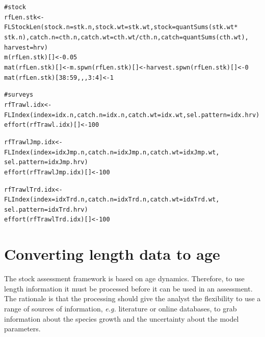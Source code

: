 \documentclass[a4paper,english,10pt]{article}\usepackage[]{graphicx}\usepackage[]{color}
\makeatletter
\newcommand{\hlnum}[1]{\textcolor[rgb]{0.2,0.2,0.2}{#1}}%
\newcommand{\hlcom}[1]{\textcolor[rgb]{0.2,0.267,0.4}{#1}}%
\newcommand{\hlopt}[1]{\textcolor[rgb]{0.2,0.2,0.2}{#1}}%
\newcommand{\hlstd}[1]{\textcolor[rgb]{0,0,0}{#1}}%
\newcommand{\hlkwb}[1]{\textcolor[rgb]{0.361,0.506,0.596}{#1}}%
\newcommand{\hlkwc}[1]{\textcolor[rgb]{0.361,0.506,0.596}{#1}}%
\newcommand{\hlkwd}[1]{\textcolor[rgb]{0.361,0.506,0.596}{#1}}%
\newenvironment{kframe}{%
 \def\at@end@of@kframe{}%
 \ifinner\ifhmode%
  \def\at@end@of@kframe{\end{minipage}}%
  \begin{minipage}{\columnwidth}%
 \fi\fi%
 \def\FrameCommand##1{\hskip\@totalleftmargin \hskip-\fboxsep
 \colorbox{shadecolor}{##1}\hskip-\fboxsep
     \hskip-\linewidth \hskip-\@totalleftmargin \hskip\columnwidth}%
 \MakeFramed {\advance\hsize-\width
   \@totalleftmargin\z@ \linewidth\hsize
   \@setminipage}}%
 {\par\unskip\endMakeFramed%
 \at@end@of@kframe}
\newenvironment{knitrout}{}{} %
\makeatother
\begin{document}
\begin{knitrout}
\color{fgcolor}\begin{kframe}
\begin{alltt}
\hlcom{# stock}
\hlstd{rfLen.stk} \hlkwb{<-} \hlkwd{FLStockLen}\hlstd{(}\hlkwc{stock.n} \hlstd{= stk.n,} \hlkwc{stock.wt} \hlstd{= stk.wt,} \hlkwc{stock} \hlstd{=} \hlkwd{quantSums}\hlstd{(stk.wt} \hlopt{*}
    \hlstd{stk.n),} \hlkwc{catch.n} \hlstd{= cth.n,} \hlkwc{catch.wt} \hlstd{= cth.wt}\hlopt{/}\hlstd{cth.n,} \hlkwc{catch} \hlstd{=} \hlkwd{quantSums}\hlstd{(cth.wt),}
    \hlkwc{harvest} \hlstd{= hrv)}
\hlkwd{m}\hlstd{(rfLen.stk)[]} \hlkwb{<-} \hlnum{0.05}
\hlkwd{mat}\hlstd{(rfLen.stk)[]} \hlkwb{<-} \hlkwd{m.spwn}\hlstd{(rfLen.stk)[]} \hlkwb{<-} \hlkwd{harvest.spwn}\hlstd{(rfLen.stk)[]} \hlkwb{<-} \hlnum{0}
\hlkwd{mat}\hlstd{(rfLen.stk)[}\hlnum{38}\hlopt{:}\hlnum{59}\hlstd{, , ,} \hlnum{3}\hlopt{:}\hlnum{4}\hlstd{]} \hlkwb{<-} \hlnum{1}

\hlcom{# surveys}
\hlstd{rfTrawl.idx} \hlkwb{<-} \hlkwd{FLIndex}\hlstd{(}\hlkwc{index} \hlstd{= idx.n,} \hlkwc{catch.n} \hlstd{= idx.n,} \hlkwc{catch.wt} \hlstd{= idx.wt,} \hlkwc{sel.pattern} \hlstd{= idx.hrv)}
\hlkwd{effort}\hlstd{(rfTrawl.idx)[]} \hlkwb{<-} \hlnum{100}

\hlstd{rfTrawlJmp.idx} \hlkwb{<-} \hlkwd{FLIndex}\hlstd{(}\hlkwc{index} \hlstd{= idxJmp.n,} \hlkwc{catch.n} \hlstd{= idxJmp.n,} \hlkwc{catch.wt} \hlstd{= idxJmp.wt,}
    \hlkwc{sel.pattern} \hlstd{= idxJmp.hrv)}
\hlkwd{effort}\hlstd{(rfTrawlJmp.idx)[]} \hlkwb{<-} \hlnum{100}

\hlstd{rfTrawlTrd.idx} \hlkwb{<-} \hlkwd{FLIndex}\hlstd{(}\hlkwc{index} \hlstd{= idxTrd.n,} \hlkwc{catch.n} \hlstd{= idxTrd.n,} \hlkwc{catch.wt} \hlstd{= idxTrd.wt,}
    \hlkwc{sel.pattern} \hlstd{= idxTrd.hrv)}
\hlkwd{effort}\hlstd{(rfTrawlTrd.idx)[]} \hlkwb{<-} \hlnum{100}
\end{alltt}
\end{kframe}
\end{knitrout}


\pagebreak
\section{Converting length data to age}

The stock assessment framework is based on age dynamics. Therefore, to use length information it must be processed before it can be used in an assessment. The rationale is that the processing should give the analyst the flexibility to use a range of sources of information, \emph{e.g.} literature or online databases, to grab information about the species growth and the uncertainty about the model parameters.
\end{document}
